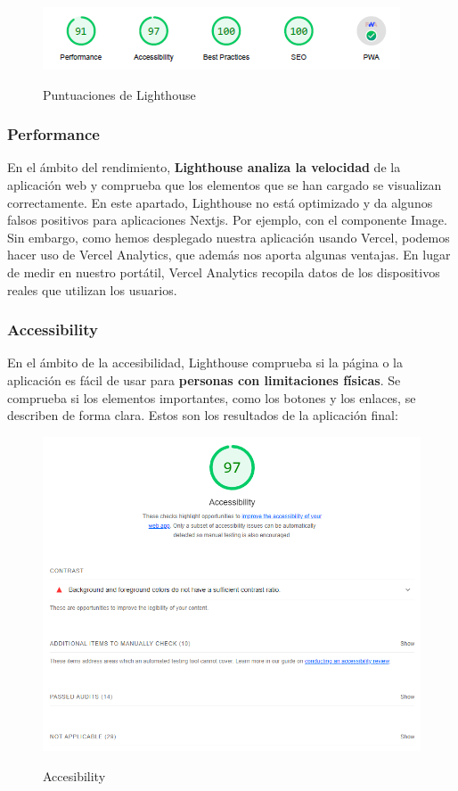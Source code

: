 \documentclass[12pt,twoside,titlepage]{report}
\begin{document}
\begin{figure}[H]
    \centering
    \includegraphics[scale=1.2]{Lighthouse_resumen}
    \label{fig:Lighthouse_resumen}
    \caption{Puntuaciones de Lighthouse}
\end{figure}

\subsubsection{Performance}

En el ámbito del rendimiento, \textbf{Lighthouse analiza la velocidad} de la aplicación web y comprueba que los elementos que se han cargado se visualizan correctamente. En este apartado, Lighthouse no está optimizado y da algunos falsos positivos para aplicaciones Nextjs. Por ejemplo, con el componente Image. Sin embargo, como hemos desplegado nuestra aplicación usando Vercel, podemos hacer uso de Vercel Analytics, que además nos aporta algunas ventajas. En lugar de medir en nuestro portátil, Vercel Analytics recopila datos de los dispositivos reales que utilizan los usuarios. 

\subsubsection{Accessibility}

En el ámbito de la accesibilidad, Lighthouse comprueba si la página o la aplicación es fácil de usar para \textbf{personas con limitaciones físicas}. Se comprueba si los elementos importantes, como los botones y los enlaces, se describen de forma clara. Estos son los resultados de la aplicación final:

\begin{figure}[H]
    \centering
    \includegraphics[scale=0.6]{Lighthouse_accesibility}
    \label{fig:Lighthouse_accesibility}
    \caption{Accesibility}
\end{figure}
\end{document}
